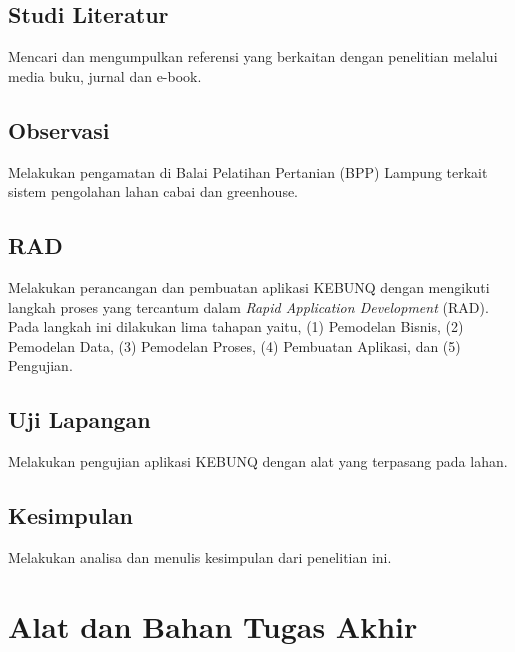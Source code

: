\begin{flushleft}
\begin{justify}
         \subsection{Studi Literatur}
         Mencari dan mengumpulkan referensi yang berkaitan dengan penelitian melalui media buku, jurnal dan e-book.\\
      
         \subsection{Observasi}
         Melakukan pengamatan di Balai Pelatihan Pertanian (BPP) Lampung terkait sistem pengolahan lahan cabai dan greenhouse.\\
         \subsection{RAD}
         Melakukan perancangan dan pembuatan aplikasi KEBUNQ dengan mengikuti langkah proses yang tercantum dalam \textit{Rapid Application Development} (RAD). Pada langkah ini dilakukan lima tahapan yaitu, (1) Pemodelan Bisnis, (2) Pemodelan Data, (3) Pemodelan Proses, (4) Pembuatan Aplikasi, dan (5) Pengujian.\\
         \subsection{Uji Lapangan}
         Melakukan pengujian aplikasi KEBUNQ dengan alat yang terpasang pada lahan.\\
         \subsection{Kesimpulan}
         Melakukan analisa dan menulis kesimpulan dari penelitian ini.\\

       \section{Alat dan Bahan Tugas Akhir}

\end{justify}
\end{flushleft}
